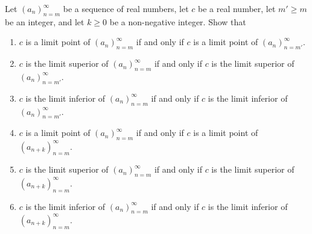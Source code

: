 \begin{exercise}\label{ex 6.4.2}
Let \((a_n)_{n = m}^\infty\) be a sequence of real numbers, let \(c\) be a real number, let \(m' \geq m\) be an integer, and let \(k \geq 0\) be a non-negative integer.
Show that
\begin{enumerate}
    \item \(c\) is a limit point of \((a_n)_{n = m}^\infty\) if and only if \(c\) is a limit point of \((a_n)_{n = m'}^\infty\).
    \item \(c\) is the limit superior of \((a_n)_{n = m}^\infty\) if and only if \(c\) is the limit superior of \((a_n)_{n = m'}^\infty\).
    \item \(c\) is the limit inferior of \((a_n)_{n = m}^\infty\) if and only if \(c\) is the limit inferior of \((a_n)_{n = m'}^\infty\).
    \item \(c\) is a limit point of \((a_n)_{n = m}^\infty\) if and only if \(c\) is a limit point of \((a_{n + k})_{n = m}^\infty\).
    \item \(c\) is the limit superior of \((a_n)_{n = m}^\infty\) if and only if \(c\) is the limit superior of \((a_{n + k})_{n = m}^\infty\).
    \item \(c\) is the limit inferior of \((a_n)_{n = m}^\infty\) if and only if \(c\) is the limit inferior of \((a_{n + k})_{n = m}^\infty\).
\end{enumerate}
\end{exercise}

